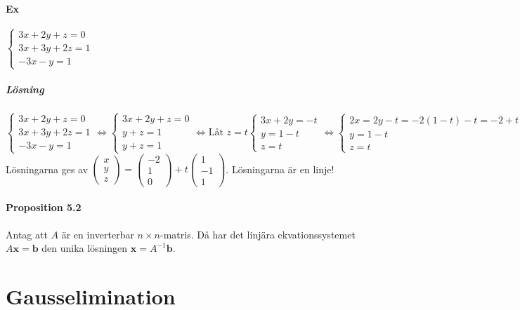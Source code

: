 \paragraph{Ex} $\begin{cases}3x+2y+z=0\\3x+3y+2z=1\\-3x-y=1\end{cases}$
\subparagraph{Lösning} 
$\begin{cases}
    3x+2y+z=0\\
    3x+3y+2z=1\\
    -3x-y=1
\end{cases}\Leftrightarrow
\begin{cases}
    3x+2y+z=0\\
    y+z=1\\
    y+z=1
\end{cases}\Leftrightarrow \text{Låt } z=t
\begin{cases}
    3x+2y=-t\\
    y=1-t\\
    z=t
\end{cases}\Leftrightarrow
\begin{cases}
    2x=2y-t=-2(1-t)-t=-2+t\\
    y=1-t\\
    z=t
\end{cases}$\\
Lösningarna ges av $\begin{pmatrix}
    x\\y\\z
\end{pmatrix}=
\begin{pmatrix}
    -2\\1\\0
\end{pmatrix}+t\begin{pmatrix}
    1\\-1\\1
\end{pmatrix}$.
Lösningarna är en linje!

\paragraph{Proposition 5.2} Antag att $A$ är en inverterbar $n\times n$-matris.
Då har det linjära ekvationssystemet $A\bm{x}=\bm{b}$ den unika lösningen $\bm{x}=A^{-1}\bm{b}$.

\section{Gausselimination}
